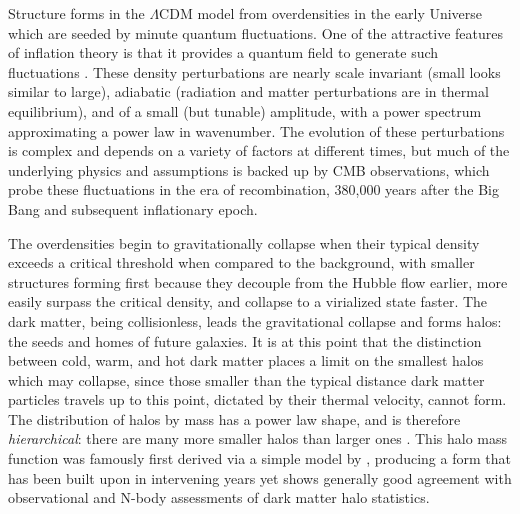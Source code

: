 Structure forms in the $\Lambda$CDM model from overdensities in the early Universe which are seeded by minute quantum fluctuations. One of the attractive features of inflation theory is that it provides a quantum field to generate such fluctuations \parencite{hawking82,guth82,starobinsky82}. These density perturbations are nearly scale invariant (small looks similar to large), adiabatic (radiation and matter perturbations are in thermal equilibrium), and of a small (but tunable) amplitude, with a power spectrum approximating a power law in wavenumber. The evolution of these perturbations is complex and depends on a variety of factors at different times, but much of the underlying physics and assumptions is backed up by CMB observations, which probe these fluctuations in the era of recombination, 380,000 years after the Big Bang and subsequent inflationary epoch.

The overdensities begin to gravitationally collapse when their typical density exceeds a critical threshold when compared to the background, with smaller structures forming first because they decouple from the Hubble flow earlier, more easily surpass the critical density, and collapse to a virialized state faster. The dark matter, being collisionless, leads the gravitational collapse and forms halos: the seeds and homes of future galaxies. It is at this point that the distinction between cold, warm, and hot dark matter places a limit on the smallest halos which may collapse, since those smaller than the typical distance dark matter particles travels up to this point, dictated by their thermal velocity, cannot form. The distribution of halos by mass has a power law shape, and is therefore \textit{hierarchical}: there are many more smaller halos than larger ones \parencite{gao04,tinker08}. This halo mass function was famously first derived via a simple model by \textcite{press74}, producing a form that has been built upon in intervening years \parencite{bond91,sheth99,sheth01} yet shows generally good agreement with observational and N-body assessments of dark matter halo statistics.

